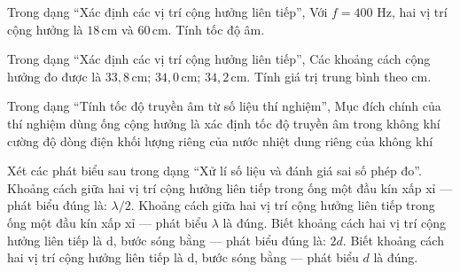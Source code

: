 \begin{ex}
Trong dạng “Xác định các vị trí cộng hưởng liên tiếp”, Với $f=400$ Hz, hai vị trí cộng hưởng là $18\,\text{cm}$ và $60\,\text{cm}$. Tính tốc độ âm.
\choiceTF

\end{ex}

\begin{ex}
Trong dạng “Xác định các vị trí cộng hưởng liên tiếp”, Các khoảng cách cộng hưởng đo được là $33,8\,\text{cm}$; $34,0\,\text{cm}$; $34,2\,\text{cm}$. Tính giá trị trung bình theo cm.
\end{ex}

\begin{ex}
Trong dạng “Tính tốc độ truyền âm từ số liệu thí nghiệm”, Mục đích chính của thí nghiệm dùng ống cộng hưởng là xác định
\choice
{\True tốc độ truyền âm trong không khí}
{cường độ dòng điện}
{khối lượng riêng của nước}
{nhiệt dung riêng của không khí}
\end{ex}

\begin{ex}
Xét các phát biểu sau trong dạng “Xử lí số liệu và đánh giá sai số phép đo”.
\choiceTF
{\True Khoảng cách giữa hai vị trí cộng hưởng liên tiếp trong ống một đầu kín xấp xỉ — phát biểu đúng là: $\lambda/2$.}
{Khoảng cách giữa hai vị trí cộng hưởng liên tiếp trong ống một đầu kín xấp xỉ — phát biểu $\lambda$ là đúng.}
{\True Biết khoảng cách hai vị trí cộng hưởng liên tiếp là d, bước sóng bằng — phát biểu đúng là: $2d$.}
{Biết khoảng cách hai vị trí cộng hưởng liên tiếp là d, bước sóng bằng — phát biểu $d$ là đúng.}
\end{ex}


